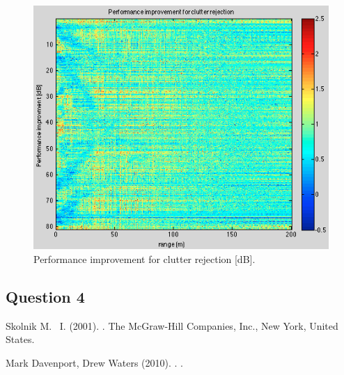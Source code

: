 \documentclass{article}
\begin{document}
\begin{figure}[ht]
\begin{minipage}[b]{0.33\linewidth}
\end{minipage}
\begin{minipage}[b]{0.33\linewidth}
\centering
\includegraphics[width=\textwidth]{Figures/improvement.png}
\caption{Performance improvement for clutter rejection [dB].}
\label{fig:improvement}
\end{minipage}
\end{figure}


\subsection{Question 4}

\newpage
\begin{thebibliography}{9}

Skolnik M. ~I.  (2001).
.
\newblock The McGraw-Hill Companies, Inc., New York, United States.

Mark Davenport, Drew Waters (2010).
.
.

\end{thebibliography}
\end{document}
